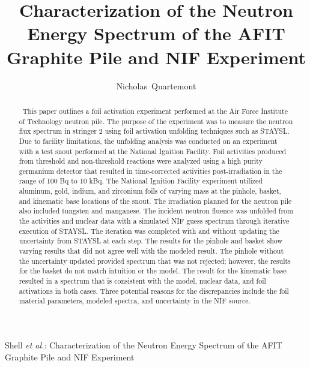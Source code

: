 \documentclass[journal]{IEEEtran}
\begin{document}
	\title{Characterization of the Neutron Energy Spectrum of the AFIT Graphite Pile and NIF Experiment}
	
	\author{Nicholas~Quartemont}
	
	{Shell \MakeLowercase{\textit{et al.}}: Characterization of the Neutron Energy Spectrum of the AFIT Graphite Pile and NIF Experiment }

	\maketitle
	
	\begin{abstract}
		\ This paper outlines a foil activation experiment performed at the Air Force Institute of Technology neutron pile.
The purpose of the experiment was to measure the neutron flux spectrum in stringer 2 using foil activation unfolding techniques such as STAYSL. 
Due to facility limitations, the unfolding analysis was conducted on an experiment with a test snout performed at the National Ignition Facility. 
Foil activities produced from threshold and non-threshold reactions were analyzed using a high purity germanium detector that resulted in time-corrected activities post-irradiation in the range of 100 Bq to 10 kBq. The National Ignition Facility experiment utilized aluminum, gold, indium, and zirconium foils of varying mass at the pinhole, basket, and kinematic base locations of the snout. The irradiation planned for the neutron pile also included tungsten and manganese. The incident neutron fluence was unfolded from the activities and nuclear data with a simulated NIF guess spectrum through iterative execution of STAYSL. The iteration was completed with and without updating the uncertainty from STAYSL at each step. The results for the pinhole and basket show varying results that did not agree well with the modeled result. The pinhole without the uncertainty updated provided spectrum that was not rejected; however, the results for the basket do not match intuition or the model. The result for the kinematic base resulted in a spectrum that is consistent with the model, nuclear data, and foil activations in both cases. Three potential reasons for the discrepancies include the foil material parameters, modeled spectra, and uncertainty in the NIF source. 

	\end{abstract}
	
\end{document}
